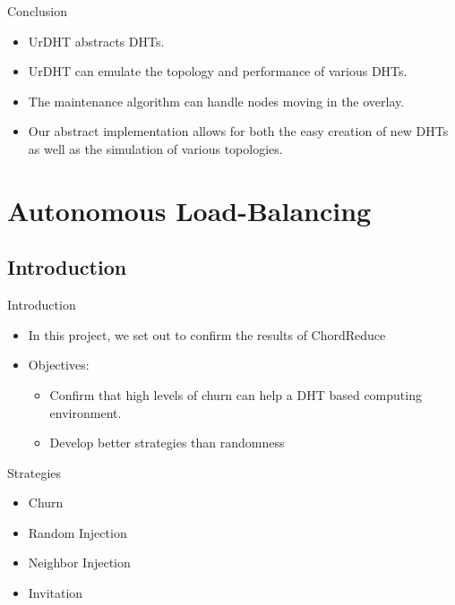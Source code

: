 \documentclass[11pt]{beamer}
\begin{document}
\begin{frame}{Conclusion}
\begin{itemize}
	\item UrDHT abstracts DHTs.
	\item UrDHT can emulate the topology and performance of various DHTs.
	\item The maintenance algorithm can handle nodes moving in the overlay.
	\item Our abstract implementation allows for both the easy creation of new DHTs as well as the simulation of various topologies.

\end{itemize}
\end{frame}

\section{Autonomous Load-Balancing}

\subsection{Introduction}
\begin{frame}{Introduction}
	\begin{itemize}
		
		\item In this project, we set out to confirm the results of ChordReduce
		\item Objectives:
		\begin{itemize}
			\item Confirm that high levels of churn can help a DHT based computing environment.
			\item Develop better strategies than randomness
		\end{itemize}
	\end{itemize}
\end{frame}



\begin{frame}{Strategies}
	\begin{itemize}
		\item Churn
		\item Random Injection
		\item Neighbor Injection
		\item Invitation
	\end{itemize}
\end{frame}
\end{document}
